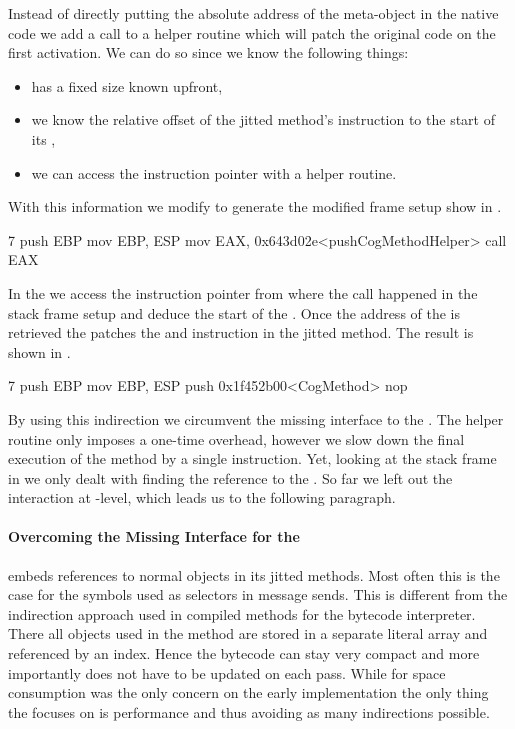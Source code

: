 Instead of directly putting the absolute address of the meta-object in the native code we add a call to a helper routine which will patch the original code on the first activation.
We can do so since we know the following things:
\begin{itemize}[noitemsep,nolistsep]
	\item \CogMethod has a fixed size known upfront,
	\item we know the relative offset of the jitted method's instruction to the start of its \CogMethod,
	\item we can access the instruction pointer with a helper routine.
\end{itemize}
%
\noindent With this information we modify \NBJ to generate the modified frame setup show in .
%
\begin{numstcode}[
	caption={\NBJ Stack Frame Setup},
	label={lst:val-nabujito-frame-setup}]{7}
push EBP
mov  EBP, ESP
mov  EAX, 0x643d02e<pushCogMethodHelper>
call EAX
\end{numstcode}
%
In the  we access the instruction pointer from where the call happened in the stack frame setup and deduce the start of the \CogMethod.
Once the address of the \CogMethod is retrieved the  patches the  and  instruction in the jitted method.
The result is shown in .
%
\begin{numstcode}[
	caption={\NBJ Patched Stack Frame Setup},
	label={lst:val-nabujito-patched-frame-setup}]{7}
push EBP
mov  EBP, ESP
push 0x1f452b00<CogMethod>
nop
\end{numstcode}
%
By using this indirection we circumvent the missing interface to the \JIT.
The helper routine only imposes a one-time overhead, however we slow down the final execution of the \NBJ method by a single  instruction.
Yet, looking at the \Cog stack frame in  we only dealt with finding the reference to the \CogMethod.
So far we left out the \GC interaction at \JIT-level, which leads us to the following paragraph.

\paragraph{Overcoming the \GC Missing \VM Interface for the \JIT}
\Cog embeds references to normal \PH objects in its jitted methods.
Most often this is the case for the symbols used as selectors in message sends.
This is different from the indirection approach used in compiled methods for the bytecode interpreter.
There all objects used in the method are stored in a separate literal array and referenced by an index.
Hence the bytecode can stay very compact and more importantly does not have to be updated on each \GC pass.
While for space consumption was the only concern on the early \ST implementation the only thing the \JIT focuses on is performance and thus avoiding as many indirections possible.

